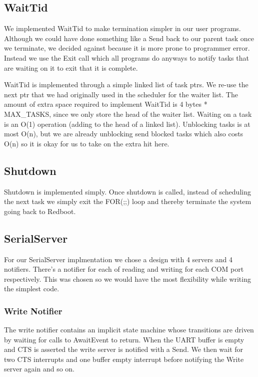 \documentclass{article}
\begin{document}
\subsection{WaitTid}

We implemented WaitTid to make termination simpler in our user programs. Although we could have done something like a Send back to our parent task once we terminate, we decided against because it is more prone to programmer error. Instead we use the Exit call which all programs do anyways to notify tasks that are waiting on it to exit that it is complete.

WaitTid is implemented through a simple linked list of task ptrs. We re-use the next ptr that we had originally used in the scheduler for the waiter list. The amount of extra space required to implement WaitTid is 4 bytes * MAX\_TASKS, since we only store the head of the waiter list. Waiting on a task is an O(1) operation (adding to the head of a linked list). Unblocking tasks is at most O(n), but we are already unblocking send blocked tasks which also costs O(n) so it is okay for us to take on the extra hit here.

\subsection{Shutdown}

Shutdown is implemented simply. Once shutdown is called, instead of scheduling the next task we simply exit the FOR(;;) loop and thereby terminate the system going back to Redboot.

\subsection{SerialServer}

For our SerialServer implmentation we chose a design with 4 servers and 4 notifiers. There's a notifier for each of reading and writing for each COM port respectively. This was chosen so we would have the most flexibility while writing the simplest code.

\subsubsection{Write Notifier}

The write notifier contains an implicit state machine whose transitions are driven by waiting for calls to AwaitEvent to return. When the UART buffer is empty and CTS is asserted the write server is notified with a Send. We then wait for two CTS interrupts and one buffer empty interrupt before notifying the Write server again and so on.
\end{document}
